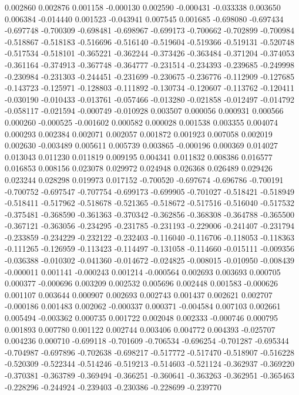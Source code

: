 0.002860
0.002876
0.001158
-0.000130
0.002590
-0.000431
-0.033338
0.003650
0.006384
-0.014440
0.001523
-0.043941
0.007545
0.001685
-0.698080
-0.697434
-0.697748
-0.700309
-0.698481
-0.698967
-0.699173
-0.700662
-0.702899
-0.700984
-0.518867
-0.518183
-0.516696
-0.516140
-0.519604
-0.519366
-0.519131
-0.520748
-0.517534
-0.518101
-0.365221
-0.362244
-0.373426
-0.363484
-0.371204
-0.374053
-0.361164
-0.374913
-0.367748
-0.364777
-0.231514
-0.234393
-0.239685
-0.249998
-0.230984
-0.231303
-0.244451
-0.231699
-0.230675
-0.236776
-0.112909
-0.127685
-0.143723
-0.125971
-0.128803
-0.111892
-0.130734
-0.120607
-0.113762
-0.120411
-0.030190
-0.010433
-0.013761
-0.057466
-0.013280
-0.021858
-0.012497
-0.014792
-0.058117
-0.021594
-0.000749
-0.010928
0.003507
0.000056
0.000931
0.000566
0.000260
-0.000525
-0.001602
0.000582
0.000028
0.001538
0.003355
0.004074
0.000293
0.002384
0.002071
0.002057
0.001872
0.001923
0.007058
0.002019
0.002630
-0.003489
0.005611
0.005739
0.003865
-0.000196
0.000369
0.014027
0.013043
0.011230
0.011819
0.009195
0.004341
0.011832
0.008386
0.016577
0.016853
0.008156
0.023078
0.029972
0.024948
0.026368
0.026489
0.029426
0.023244
0.028298
0.019973
0.017152
-0.700520
-0.697674
-0.696786
-0.700191
-0.700752
-0.697547
-0.707754
-0.699173
-0.699905
-0.701027
-0.518421
-0.518949
-0.518411
-0.517962
-0.518678
-0.521365
-0.518672
-0.517516
-0.516040
-0.517532
-0.375481
-0.368590
-0.361363
-0.370342
-0.362856
-0.368308
-0.364788
-0.365500
-0.367121
-0.363056
-0.234295
-0.231785
-0.231193
-0.229006
-0.241407
-0.231794
-0.233859
-0.234229
-0.232122
-0.232403
-0.116040
-0.116706
-0.118053
-0.118363
-0.111265
-0.126959
-0.113423
-0.114497
-0.131058
-0.114660
-0.015111
-0.009356
-0.036388
-0.010302
-0.041360
-0.014672
-0.024825
-0.008015
-0.010950
-0.008439
-0.000011
0.001141
-0.000243
0.001214
-0.000564
0.002693
0.003693
0.000705
0.000377
-0.000696
0.003209
0.002532
0.005696
0.002448
0.001583
-0.000626
0.001107
0.003644
0.000907
0.002693
0.002743
0.001437
0.002621
0.002707
-0.000186
0.001483
0.002062
-0.000337
0.000371
-0.004584
0.007103
0.002661
0.005494
-0.003362
0.000735
0.001722
0.002048
0.002333
-0.000746
0.000795
0.001893
0.007780
0.001122
0.002744
0.003406
0.004772
0.004393
-0.025707
0.004236
0.000710
-0.699118
-0.701609
-0.706534
-0.696254
-0.701287
-0.695344
-0.704987
-0.697896
-0.702638
-0.698217
-0.517772
-0.517470
-0.518907
-0.516228
-0.520309
-0.522344
-0.514246
-0.519213
-0.514603
-0.521124
-0.362937
-0.369220
-0.370381
-0.363789
-0.369494
-0.366251
-0.360641
-0.363263
-0.362951
-0.365463
-0.228296
-0.244924
-0.239403
-0.230386
-0.228699
-0.239770
